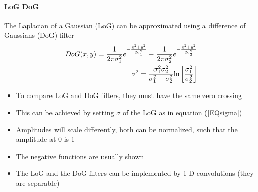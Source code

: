 \paragraph{LoG DoG}
The Laplacian of a Gaussian (LoG) can be approximated using a difference of Gaussians (DoG) filter
\begin{align}
DoG(x,y)=\frac{1}{2\pi\sigma_1^2}e^{-\frac{x^2+y^2}{2\sigma_1^2}}-\frac{1}{2\pi\sigma_2^2}e^{-\frac{x^2+y^2}{2\sigma_2^2}}\notag\\
\sigma^2=\frac{\sigma_1^2\sigma_2^2}{\sigma_1^2-\sigma_2^2}\text{ln}\left[\frac{\sigma_1^2}{\sigma_2^2}\right]\label{EQsigma}
\end{align}
\begin{itemize}
\item To compare LoG and DoG filters, they must have the same zero crossing
\item This can be achieved by setting $\sigma$ of the LoG as in equation (\ref{EQsigma})
\item Amplitudes will scale differently, both can be normalized, such that the amplitude at 0 is 1
\item The negative functions are usually shown
\item The LoG and the DoG filters can be implemented by 1-D convolutions (they are separable)
\end{itemize}


